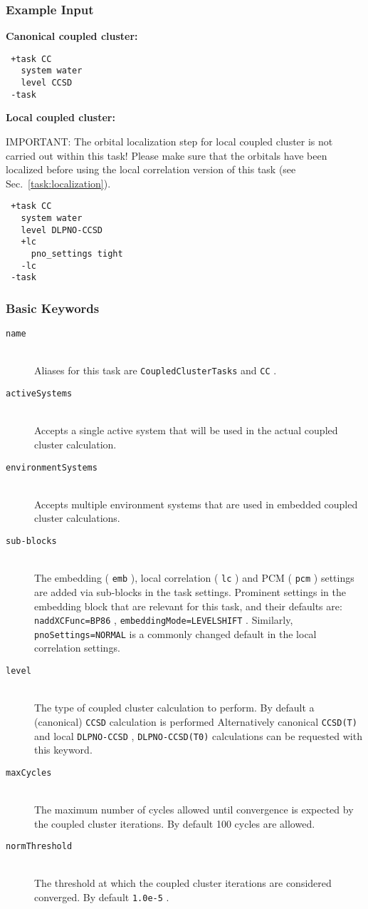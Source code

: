\documentclass[bibliography=totocnumbered,a4paper,10pt,oneside]{scrbook}
\newcommand{\ttt}[1]{%
  \begingroup\setlength{\fboxsep}{1pt}%
  \colorbox{serenity-green!30}{\texttt{\hspace*{2pt}\vphantom{(g}#1\hspace*{2pt}}}%
  \endgroup
}
\begin{document}
\subsubsection{Example Input}
\textbf{Canonical coupled cluster:}
\begin{lstlisting}
 +task CC
   system water
   level CCSD
 -task
\end{lstlisting}
\textbf{Local coupled cluster:}

{\color{red}IMPORTANT: } The orbital localization step for local coupled cluster is not carried out
within this task! Please make sure that the orbitals have been localized before using the local
correlation version of this task (see Sec.~\ref{task:localization}).
\begin{lstlisting}
 +task CC
   system water
   level DLPNO-CCSD
   +lc
     pno_settings tight
   -lc
 -task
\end{lstlisting}
\subsubsection{Basic Keywords}
\begin{description}
 \item [\texttt{name}]\hfill \\
   Aliases for this task are \ttt{CoupledClusterTasks} and \ttt{CC}.
 \item [\texttt{activeSystems}]\hfill \\
   Accepts a single active system that will be used in the actual coupled cluster calculation.
 \item [\texttt{environmentSystems}]\hfill \\
   Accepts multiple environment systems that are used in embedded coupled cluster calculations.
 \item [\texttt{sub-blocks}]\hfill \\
   The embedding (\ttt{emb}), local correlation (\ttt{lc}) and PCM (\ttt{pcm}) settings are added via sub-blocks in the task settings.
   Prominent settings in the embedding block that are relevant for this task, and their defaults are:
   \ttt{naddXCFunc=BP86}, \ttt{embeddingMode=LEVELSHIFT}.
   Similarly, \ttt{pnoSettings=NORMAL} is a commonly changed default in the local correlation settings.
 \item [\texttt{level}]\hfill \\
   The type of coupled cluster calculation to perform. By default a (canonical) \ttt{CCSD} calculation is performed
   Alternatively canonical \ttt{CCSD(T)} and local \ttt{DLPNO-CCSD}, \ttt{DLPNO-CCSD(T0)} calculations can be
   requested with this keyword.
 \item [\texttt{maxCycles}]\hfill \\
   The maximum number of cycles allowed until convergence is expected by the coupled cluster iterations.
   By default 100 cycles are allowed.
 \item [\texttt{normThreshold}]\hfill \\
   The threshold at which the coupled cluster iterations are considered converged. By default \ttt{1.0e-5}.
\end{description}
\end{document}

